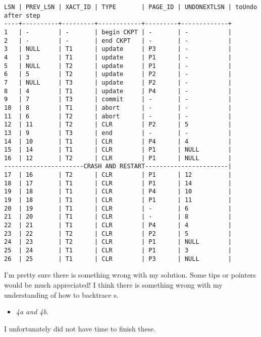 \begin{verbatim}
LSN | PREV_LSN | XACT_ID | TYPE       | PAGE_ID | UNDONEXTLSN | toUndo after step
----+----------+---------+------------+---------+-------------+
1   | -        | -       | begin CKPT | -       | -           |
2   | -        | -       | end CKPT   | -       | -           |
3   | NULL     | T1      | update     | P3      | -           |
4   | 3        | T1      | update     | P1      | -           |
5   | NULL     | T2      | update     | P1      | -           |
6   | 5        | T2      | update     | P2      | -           |
7   | NULL     | T3      | update     | P2      | -           |
8   | 4        | T1      | update     | P4      | -           |
9   | 7        | T3      | commit     | -       | -           |
10  | 8        | T1      | abort      | -       | -           |
11  | 6        | T2      | abort      | -       | -           |
12  | 11       | T2      | CLR        | P2      | 5           |
13  | 9        | T3      | end        | -       | -           |
14  | 10       | T1      | CLR        | P4      | 4           |
15  | 14       | T1      | CLR        | P1      | NULL        |
16  | 12       | T2      | CLR        | P1      | NULL        |
----------------------CRASH AND RESTART-----------------------|
17  | 16       | T2      | CLR        | P1      | 12          |
18  | 17       | T1      | CLR        | P1      | 14          |
19  | 18       | T1      | CLR        | P4      | 10          |
19  | 18       | T1      | CLR        | P1      | 11          |
20  | 19       | T1      | CLR        | -       | 6           |
21  | 20       | T1      | CLR        | -       | 8           |
22  | 21       | T1      | CLR        | P4      | 4           |
23  | 22       | T2      | CLR        | P2      | 5           |
24  | 23       | T2      | CLR        | P1      | NULL        |
25  | 24       | T1      | CLR        | P1      | 3           |
26  | 25       | T1      | CLR        | P3      | NULL        |
\end{verbatim}

I'm pretty sure there is something wrong with my solution. Some tips or pointers
would be much appreciated! I think there is something wrong with my understanding of how to backtrace
s.


\begin{itemize}
  \item \textit{4a and 4b.}
\end{itemize}

I unfortunately did not have time to finish these.



\tykstreg
